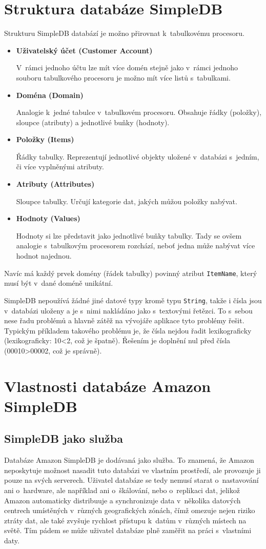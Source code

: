 \documentclass[oneside,12pt,final]{fithesis2}
\begin{document}
\section{Struktura databáze SimpleDB}
Strukturu SimpleDB databází je možno přirovnat k~tabulkovému procesoru.
\begin{itemize}
 \item \textbf{Uživatelský účet (Customer Account)}
 
 V~rámci jednoho účtu lze mít více domén stejně jako v~rámci jednoho souboru tabulkového procesoru je možno mít více listů s~tabulkami.
 \item \textbf{Doména (Domain)}
 
 Analogie k~jedné tabulce v~tabulkovém procesoru. Obsahuje řádky (položky), sloupce (atributy) a jednotlivé buňky (hodnoty).
 \item \textbf{Položky (Items)}
 
 Řádky tabulky. Reprezentují jednotlivé objekty uložené v~databázi s~jedním, či více vyplněnými atributy.
 \item \textbf{Atributy (Attributes)}
 
 Sloupce tabulky. Určují kategorie dat, jakých můžou položky nabývat.
 
 \item \textbf{Hodnoty (Values)}
 
 Hodnoty si lze představit jako jednotlivé buňky tabulky. Tady se ovšem analogie s~tabulkovým procesorem rozchází, neboť jedna  může nabývat více hodnot najednou.
 
\end{itemize}
Navíc má každý prvek domény (řádek tabulky) povinný atribut \verb<ItemName<, který musí být v~dané doméně unikátní.

SimpleDB nepoužívá žádné jiné datové typy kromě typu \verb<String<, takže i čísla jsou v~databázi uloženy a je s~nimi nakládáno jako s~textovými řetězci. To s~sebou nese řadu problémů a hlavně zátěž na vývojáře aplikace tyto problémy řešit. Typickým příkladem takového problému je, že čísla nejdou řadit lexikograficky (lexikograficky: 10<2, což je špatně). Řešením je doplnění nul před čísla (00010>00002, což je správně).

\section{Vlastnosti databáze Amazon SimpleDB}
\subsection{SimpleDB jako služba}
Databáze Amazon SimpleDB je dodávaná jako služba. To znamená, že Amazon neposkytuje možnost nasadit tuto databázi ve vlastním prostředí, ale provozuje ji pouze na svých serverech. Uživatel databáze se tedy nemusí starat o~nastavování ani o~hardware, ale například ani o~škálování, nebo o~replikaci dat, jelikož Amazon automaticky distribuuje a synchronizuje data v~několika datových centrech umístěných v~různých geografických zónách, čímž omezuje nejen riziko ztráty dat, ale také zvyšuje rychlost přístupu k~datům v~různých místech na světě. Tím pádem se může uživatel databáze plně zaměřit na práci s~vlastními daty.
\end{document}
